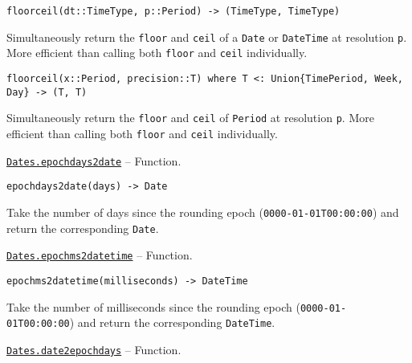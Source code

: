 \begin{adjustwidth}{2em}{0pt}


\begin{verbatim}
floorceil(dt::TimeType, p::Period) -> (TimeType, TimeType)
\end{verbatim}

Simultaneously return the \texttt{floor} and \texttt{ceil} of a \texttt{Date} or \texttt{DateTime} at resolution \texttt{p}. More efficient than calling both \texttt{floor} and \texttt{ceil} individually.




\begin{lstlisting}
floorceil(x::Period, precision::T) where T <: Union{TimePeriod, Week, Day} -> (T, T)
\end{lstlisting}

Simultaneously return the \texttt{floor} and \texttt{ceil} of \texttt{Period} at resolution \texttt{p}.  More efficient than calling both \texttt{floor} and \texttt{ceil} individually.



\end{adjustwidth}
\hypertarget{6172851707225539496}{} 
\hyperlink{6172851707225539496}{\texttt{Dates.epochdays2date}}  -- {Function.}

\begin{adjustwidth}{2em}{0pt}


\begin{verbatim}
epochdays2date(days) -> Date
\end{verbatim}

Take the number of days since the rounding epoch (\texttt{0000-01-01T00:00:00}) and return the corresponding \texttt{Date}.



\end{adjustwidth}
\hypertarget{228819666916608027}{} 
\hyperlink{228819666916608027}{\texttt{Dates.epochms2datetime}}  -- {Function.}

\begin{adjustwidth}{2em}{0pt}


\begin{verbatim}
epochms2datetime(milliseconds) -> DateTime
\end{verbatim}

Take the number of milliseconds since the rounding epoch (\texttt{0000-01-01T00:00:00}) and return the corresponding \texttt{DateTime}.



\end{adjustwidth}
\hypertarget{4031977144092247953}{} 
\hyperlink{4031977144092247953}{\texttt{Dates.date2epochdays}}  -- {Function.}

